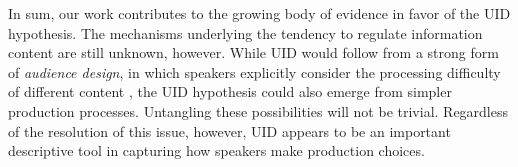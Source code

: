 \documentclass[11pt,letterpaper]{article}
\begin{document}
In sum, our work contributes to the growing body of evidence in favor of the UID hypothesis. The mechanisms underlying the tendency to regulate information content are still unknown, however. While UID would follow from a strong form of \emph{audience design}, in which speakers explicitly consider the processing difficulty of different content \cite{clark1996}, the UID hypothesis could also emerge from simpler production processes. Untangling these possibilities will not be trivial. Regardless of the resolution of this issue, however, UID appears to be an important descriptive tool in capturing how speakers make production choices. 

%

\newpage



\end{document}
